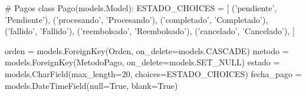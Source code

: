 # Pagos
class Pago(models.Model):
    ESTADO_CHOICES = [
        ('pendiente', 'Pendiente'),
        ('procesando', 'Procesando'),
        ('completado', 'Completado'),
        ('fallido', 'Fallido'),
        ('reembolsado', 'Reembolsado'),
        ('cancelado', 'Cancelado'),
    ]
    
    orden = models.ForeignKey(Orden, on_delete=models.CASCADE)
    metodo = models.ForeignKey(MetodoPago, on_delete=models.SET_NULL)
    estado = models.CharField(max_length=20, choices=ESTADO_CHOICES)
    fecha_pago = models.DateTimeField(null=True, blank=True)

